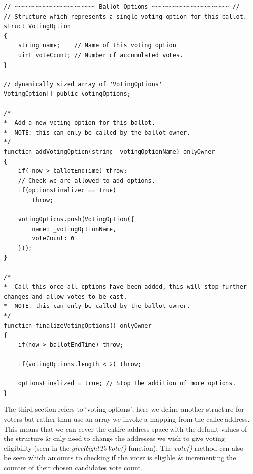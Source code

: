 \documentclass{article}
\begin{document}
\begin{lstlisting}[caption=Functions used for modifying the ballot during setup.]
// ~~~~~~~~~~~~~~~~~~~~~~~ Ballot Options ~~~~~~~~~~~~~~~~~~~~~~ //
// Structure which represents a single voting option for this ballot.
struct VotingOption
{
    string name;    // Name of this voting option
    uint voteCount; // Number of accumulated votes.
}

// dynamically sized array of 'VotingOptions'
VotingOption[] public votingOptions;

/*
*  Add a new voting option for this ballot.
*  NOTE: this can only be called by the ballot owner.
*/
function addVotingOption(string _votingOptionName) onlyOwner
{
    if( now > ballotEndTime) throw;
    // Check we are allowed to add options.
    if(optionsFinalized == true)    
        throw;

    votingOptions.push(VotingOption({
        name: _votingOptionName,
        voteCount: 0
    }));
}

/*
*  Call this once all options have been added, this will stop further changes and allow votes to be cast.
*  NOTE: this can only be called by the ballot owner.
*/
function finalizeVotingOptions() onlyOwner
{
    if(now > ballotEndTime) throw;

    if(votingOptions.length < 2) throw;

    optionsFinalized = true; // Stop the addition of more options.
}
\end{lstlisting}
\cleardoublepage

The third section refers to `voting options', here we define another structure for voters but rather than use an array we invoke a mapping from the callee address. This means that we can cover the entire address space with the default values of the structure \& only need to change the addresses we wish to give voting eligibility (seen in the \textit{giveRightToVote()} function). The \textit{vote()} method can also be seen which amounts to checking if the voter is eligible \& incrementing the counter of their chosen candidates vote count.
\end{document}
